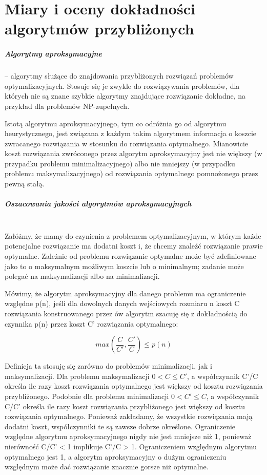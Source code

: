 \documentclass[]{report}
\begin{document}
\chapter{Miary i oceny dokładności algorytmów przybliżonych}

\paragraph{Algorytmy aproksymacyjne} – algorytmy służące do znajdowania przybliżonych rozwiązań problemów optymalizacyjnych. Stosuje się je zwykle do rozwiązywania problemów, dla których nie są znane szybkie algorytmy znajdujące rozwiązanie dokładne, na przykład dla problemów NP-zupełnych.


Istotą algorytmu aproksymacyjnego, tym co odróżnia go od algorytmu heurystycznego, jest związana z każdym takim algorytmem informacja o koszcie zwracanego rozwiązania w stosunku do rozwiązania optymalnego. Mianowicie koszt rozwiązania zwróconego przez algorytm aproksymacyjny jest nie większy (w przypadku problemu minimalizacyjnego) albo nie mniejszy (w przypadku problemu maksymalizacyjnego) od rozwiązania optymalnego pomnożonego przez pewną stałą.

\paragraph{Oszacowania jakości algorytmów aproksymacyjnych\\\\}

Załóżmy, że mamy do czynienia z problemem optymalizacyjnym, w którym każde potencjalne rozwiązanie ma dodatni koszt i, że chcemy znaleźć rozwiązanie prawie optymalne. Zależnie od problemu rozwiązanie optymalne może być zdefiniowane jako to o maksymalnym możliwym koszcie lub o minimalnym; zadanie może polegać na maksymalizacji albo na minimalizacji.


Mówimy, że algorytm aproksymacyjny dla danego problemu ma ograniczenie względne p(n), jeśli dla dowolnych danych wejściowych rozmiaru n koszt C rozwiązania konstruowanego przez ów algorytm szacuję się z dokładnością do czynnika p(n) przez koszt C' rozwiązania optymalnego:

$$ max(\frac{C}{C'},\frac{C'}{C}) \le p(n) $$


Definicja ta stosuję się zarówno do problemów minimalizacji, jak i maksymalizacji. Dla problemu maksymalizacji $ 0 < C \le C' $, a współczynnik C'/C określa ile razy koszt rozwiązania optymalnego jest większy od kosztu rozwiązania przybliżonego. Podobnie dla problemu minimalizacji $ 0 < C' \le C$, a współczynnik C/C' określa ile razy koszt rozwiązania przybliżonego jest większy od kosztu rozwiązania optymalnego. Ponieważ zakładamy, że wszystkie rozwiązania mają dodatni koszt, współczynniki te są zawsze dobrze określone. Ograniczenie względne algorytmu aproksymacyjnego nigdy nie jest mniejsze niż 1, ponieważ nierówność C/C' < 1 implikuje C'/C > 1. Ograniczeniem względnym algorytmu optymalnego jest 1, a algorytm aproksymacyjny o dużym ograniczeniu względnym może dać rozwiązanie znacznie gorsze niż optymalne.
\end{document}
